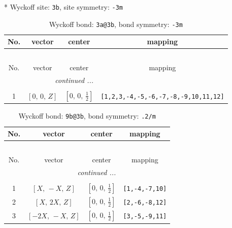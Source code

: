 \documentclass[fleqn,8pt]{jsarticle}
\begin{document}
* Wyckoff site: {\tt 3b}, site symmetry: {\tt -3m}
\renewcommand{\arraystretch}{1.2}
\begin{longtable}{cccc}
\caption{Wyckoff bond: {\tt 3a@3b}, bond symmetry: {\tt -3m}}
 \\
 \hline \hline
No. & vector & center & mapping \\ \hline \endfirsthead

\multicolumn{3}{l}{\tablename\ \thetable{}} \\
 \hline \hline
No. & vector & center & mapping \\ \hline \endhead

 \hline \hline
\multicolumn{3}{r}{\footnotesize\it continued ...} \\ \endfoot

 \hline \hline
\multicolumn{3}{r}{} \\ \endlastfoot

1 & $\left[ 0,\, 0,\, Z \right]$ & $\left[ 0,\, 0,\, \frac{1}{2} \right]$ & {\tt [1,2,3,-4,-5,-6,-7,-8,-9,10,11,12]} \\
\end{longtable}
\renewcommand{\arraystretch}{1.2}
\begin{longtable}{cccc}
\caption{Wyckoff bond: {\tt 9b@3b}, bond symmetry: {\tt .2/m}}
 \\
 \hline \hline
No. & vector & center & mapping \\ \hline \endfirsthead

\multicolumn{3}{l}{\tablename\ \thetable{}} \\
 \hline \hline
No. & vector & center & mapping \\ \hline \endhead

 \hline \hline
\multicolumn{3}{r}{\footnotesize\it continued ...} \\ \endfoot

 \hline \hline
\multicolumn{3}{r}{} \\ \endlastfoot

1 & $\left[ X,\, - X,\, Z \right]$ & $\left[ 0,\, 0,\, \frac{1}{2} \right]$ & {\tt [1,-4,-7,10]} \\ \hline
2 & $\left[ X,\, 2 X,\, Z \right]$ & $\left[ 0,\, 0,\, \frac{1}{2} \right]$ & {\tt [2,-6,-8,12]} \\ \hline
3 & $\left[ - 2 X,\, - X,\, Z \right]$ & $\left[ 0,\, 0,\, \frac{1}{2} \right]$ & {\tt [3,-5,-9,11]} \\
\end{longtable}
\renewcommand{\arraystretch}{1.2}
\end{document}
